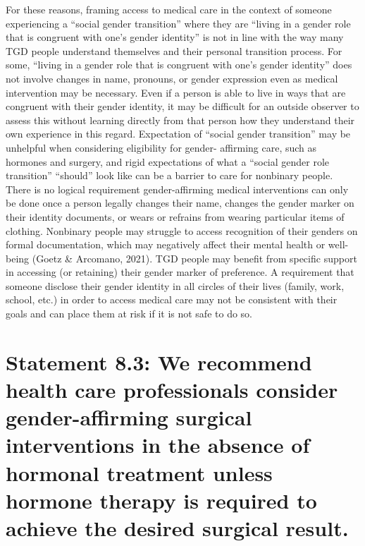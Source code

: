 \documentclass[
]{book}
\begin{document}
For these reasons, framing access to medical
care in the context of someone experiencing a
``social gender transition'' where they are ``living
in a gender role that is congruent with one's gender identity'' is not in line with the way many
TGD people understand themselves and their
personal transition process. For some, ``living in
a gender role that is congruent with one's gender
identity'' does not involve changes in name, pronouns, or gender expression even as medical
intervention may be necessary. Even if a person
is able to live in ways that are congruent with
their gender identity, it may be difficult for an
outside observer to assess this without learning
directly from that person how they understand
their own experience in this regard. Expectation
of ``social gender transition'' may be unhelpful
when considering eligibility for gender- affirming
care, such as hormones and surgery, and rigid
expectations of what a ``social gender role transition'' ``should'' look like can be a barrier to care
for nonbinary people. There is no logical requirement gender-affirming medical interventions can
only be done once a person legally changes their
name, changes the gender marker on their identity documents, or wears or refrains from wearing
particular items of clothing. Nonbinary people
may struggle to access recognition of their genders on formal documentation, which may negatively affect their mental health or well-being
(Goetz \& Arcomano, 2021). TGD people may
benefit from specific support in accessing (or
retaining) their gender marker of preference. A
requirement that someone disclose their gender
identity in all circles of their lives (family, work,
school, etc.) in order to access medical care may
not be consistent with their goals and can place
them at risk if it is not safe to do so.

\hypertarget{statement-8.3-we-recommend-health-care-professionals-consider-gender-affirming-surgical-interventions-in-the-absence-of-hormonal-treatment-unless-hormone-therapy-is-required-to-achieve-the-desired-surgical-result.}{%
\section*{Statement 8.3: We recommend health care professionals consider gender-affirming surgical interventions in the absence of hormonal treatment unless hormone therapy is required to achieve the desired surgical result.}\label{statement-8.3-we-recommend-health-care-professionals-consider-gender-affirming-surgical-interventions-in-the-absence-of-hormonal-treatment-unless-hormone-therapy-is-required-to-achieve-the-desired-surgical-result.}}
\end{document}

